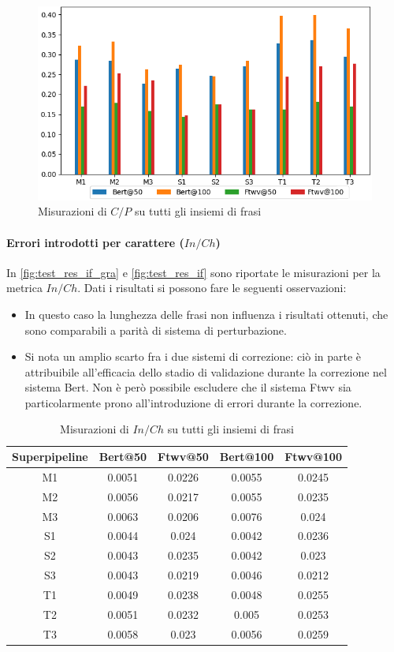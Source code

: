 \begin{figure}[H]
\centering
\includegraphics[width=\textwidth]{immagini/test/cp}
\caption{Misurazioni di $C/P$ su tutti gli insiemi di frasi}
\label{fig:test_res_cp}
\end{figure}

\paragraph{Errori introdotti per carattere ($In/Ch$)}
In \autoref{fig:test_res_if_gra} e \autoref{fig:test_res_if} sono riportate le misurazioni per la metrica $In/Ch$. Dati i risultati si possono fare le seguenti osservazioni:
\begin{itemize}
\item In questo caso la lunghezza delle frasi non influenza i risultati ottenuti, che sono comparabili a parità di sistema di perturbazione.

\item Si nota un amplio scarto fra i due sistemi di correzione: ciò in parte è attribuibile all'efficacia dello stadio di validazione durante la correzione nel sistema Bert. Non è però possibile escludere che il sistema Ftwv sia particolarmente prono all'introduzione di errori durante la correzione.
\end{itemize}

\begin{table}[H]
\centering
\begin{tabular}{c|cc|cc}
\textbf{Superpipeline} & \textbf{Bert@50} &  \textbf{Ftwv@50} & \textbf{Bert@100} & \textbf{Ftwv@100}\\
\hline
M1& 0.0051& 0.0226& 0.0055& 0.0245\\
M2& 0.0056& 0.0217& 0.0055& 0.0235\\
M3& 0.0063& 0.0206& 0.0076& 0.024\\
S1& 0.0044& 0.024& 0.0042& 0.0236\\
S2& 0.0043& 0.0235& 0.0042& 0.023\\
S3& 0.0043& 0.0219& 0.0046& 0.0212\\
T1& 0.0049& 0.0238& 0.0048& 0.0255\\
T2& 0.0051& 0.0232& 0.005& 0.0253\\
T3& 0.0058& 0.023& 0.0056& 0.0259\\
\end{tabular}
\caption{Misurazioni di $In/Ch$ su tutti gli insiemi di frasi}
\label{fig:test_res_if_gra}
\end{table}

